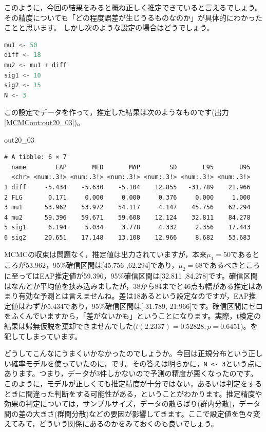 \documentclass{ltjsbook}
\begin{document}
このように，今回の結果をみると概ね正しく推定できていると言えるでしょう。その精度についても「どの程度誤差が生じうるものなのか」が具体的にわかったことと思います。
しかし次のような設定の場合はどうでしょう。
\begin{lstlisting}[language=c++,label={code:20_05},caption={仮想データの生成その2}]
mu1 <- 50
diff <- 18
mu2 <- mu1 + diff
sig1 <- 10
sig2 <- 15
N <- 3
\end{lstlisting}
この設定でデータを作って，推定した結果は次のようなものです(出力\ref{MCMCout:out20_03})。
\begin{MCMCout}{}{out20_03}
	\begin{verbatim}
# A tibble: 6 × 7
  name        EAP       MED       MAP        SD       L95       U95
  <chr> <num:.3!> <num:.3!> <num:.3!> <num:.3!> <num:.3!> <num:.3!>
1 diff     -5.434    -5.630    -5.104    12.855   -31.789    21.966
2 FLG       0.171     0.000     0.000     0.376     0.000     1.000
3 mu1      53.962    53.972    54.117     4.147    45.756    62.294
4 mu2      59.396    59.671    59.608    12.124    32.811    84.278
5 sig1      6.194     5.034     3.778     4.332     2.356    17.443
6 sig2     20.651    17.148    13.108    12.966     8.682    53.683
\end{verbatim}
\end{MCMCout}
MCMCの収束は問題なく，推定値は出力されていますが，本来$\mu_1=50$であるところが53.962，95\%確信区間は[45.756 ,62.294]であり，$\mu_2=68$であるべきところに至ってはEAP推定値が59.396，95\%確信区間は[32.811 ,84.278]です。確信区間はなんとか平均値を挟み込みましたが，38から84までと46点も幅がある推定はあまり有効な予測とは言えませんね。差は18あるという設定なのですが，EAP推定値はわずか5.434であり，95\%確信区間は[-31.789, 21.966]です。確信区間にゼロをふくんでいますから，「差がないかも」ということになります。実際，t検定の結果は帰無仮説を棄却できませんでした($t(2.2337)=0.52828,p=0.6451$)。を犯してしまっています。

どうしてこんなにうまくいかなかったのでしょうか。今回は正規分布という正しい確率モデルを使っていたのに，です。その答えは明らかに，\verb|N <- 3|という点にあります。つまり，データが3件しかないので予測の精度が悪くなったのです。
このように，モデルが正しくても推定精度が十分ではない，あるいは判定をするときに間違った判断をする可能性がある，ということがわかります。推定精度や効果の判定については，サンプルサイズ，データの散らばり(群内分散)，データ間の差の大きさ(群間分散)などの要因が影響してきます。ここで設定値を色々変えてみて，どういう関係にあるのかをみておくのも良いでしょう。
\end{document}
